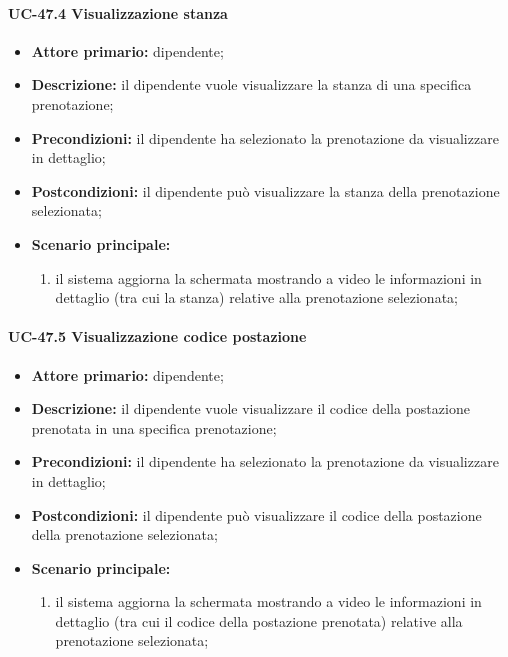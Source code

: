 \paragraph{UC-47.4 Visualizzazione stanza}

    \begin{itemize}
        \item \textbf{Attore primario:} dipendente;

        \item \textbf{Descrizione:} il dipendente vuole visualizzare la stanza di una specifica prenotazione;

        \item \textbf{Precondizioni:} il dipendente ha selezionato la prenotazione da visualizzare in dettaglio;

        \item \textbf{Postcondizioni:} il dipendente può visualizzare la stanza della prenotazione selezionata;

        \item \textbf{Scenario principale:}
            \begin{enumerate}
                 \item il sistema aggiorna la schermata mostrando a video le informazioni in dettaglio (tra cui la stanza) relative alla prenotazione selezionata;
            \end{enumerate}
    \end{itemize} 

\paragraph{UC-47.5 Visualizzazione codice postazione}

    \begin{itemize}
        \item \textbf{Attore primario:} dipendente;

        \item \textbf{Descrizione:} il dipendente vuole visualizzare il codice della postazione prenotata in una specifica prenotazione;

        \item \textbf{Precondizioni:} il dipendente ha selezionato la prenotazione da visualizzare in dettaglio;

        \item \textbf{Postcondizioni:} il dipendente può visualizzare il codice della postazione della prenotazione selezionata;

        \item \textbf{Scenario principale:}
            \begin{enumerate}
                \item il sistema aggiorna la schermata mostrando a video le informazioni in dettaglio (tra cui il codice della postazione prenotata) relative alla prenotazione selezionata;
            \end{enumerate}
    \end{itemize} 

